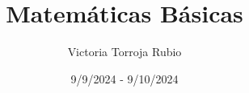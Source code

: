 \documentclass{report}
\begin{document}
\title{Matemáticas Básicas}
\author{Victoria Torroja Rubio}
\date{9/9/2024 - 9/10/2024}

\maketitle

\tableofcontents

\pagebreak

\end{document}
